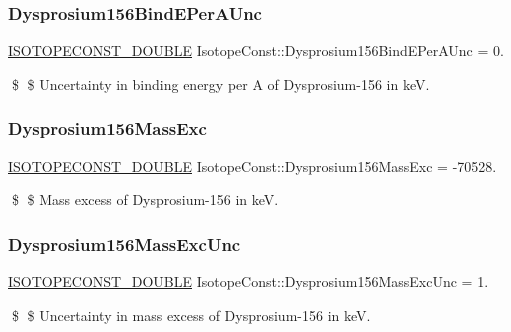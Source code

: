 \subsubsection{\texorpdfstring{Dysprosium156\+Bind\+E\+Per\+A\+Unc}{Dysprosium156BindEPerAUnc}}
{\footnotesize\ttfamily \mbox{\hyperlink{group___isotope_const-_macros_ga8f45a7272ce02c0b4c65c44636ed719a}{I\+S\+O\+T\+O\+P\+E\+C\+O\+N\+S\+T\+\_\+\+D\+O\+U\+B\+LE}} Isotope\+Const\+::\+Dysprosium156\+Bind\+E\+Per\+A\+Unc = 0.}

\$ \$ Uncertainty in binding energy per A of Dysprosium-\/156 in keV. \mbox{\label{group___isotope_const-_dysprosium-_dy156_ga12c9792cb08207b6642d47be5b868377}} 
\subsubsection{\texorpdfstring{Dysprosium156\+Mass\+Exc}{Dysprosium156MassExc}}
{\footnotesize\ttfamily \mbox{\hyperlink{group___isotope_const-_macros_ga8f45a7272ce02c0b4c65c44636ed719a}{I\+S\+O\+T\+O\+P\+E\+C\+O\+N\+S\+T\+\_\+\+D\+O\+U\+B\+LE}} Isotope\+Const\+::\+Dysprosium156\+Mass\+Exc = -\/70528.}

\$ \$ Mass excess of Dysprosium-\/156 in keV. \mbox{\label{group___isotope_const-_dysprosium-_dy156_ga905d03397078940f54368459c4d5d33a}} 
\subsubsection{\texorpdfstring{Dysprosium156\+Mass\+Exc\+Unc}{Dysprosium156MassExcUnc}}
{\footnotesize\ttfamily \mbox{\hyperlink{group___isotope_const-_macros_ga8f45a7272ce02c0b4c65c44636ed719a}{I\+S\+O\+T\+O\+P\+E\+C\+O\+N\+S\+T\+\_\+\+D\+O\+U\+B\+LE}} Isotope\+Const\+::\+Dysprosium156\+Mass\+Exc\+Unc = 1.}

\$ \$ Uncertainty in mass excess of Dysprosium-\/156 in keV. \mbox{\label{group___isotope_const-_dysprosium-_dy156_ga1bc414bcfdb3dd632ad0eaf86ac42311}} 
